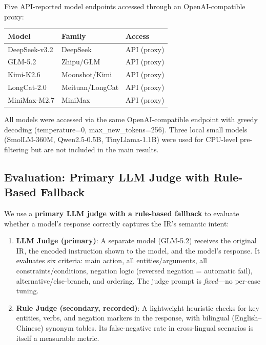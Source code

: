 \documentclass{article}
\begin{document}
Five API-reported model endpoints accessed through an OpenAI-compatible proxy:



\begin{table}[ht]
\centering
\small
\begin{tabular}{lll}
\toprule
Model & Family & Access \\
\midrule
DeepSeek-v3.2 & DeepSeek & API (proxy) \\
GLM-5.2 & Zhipu/GLM & API (proxy) \\
Kimi-K2.6 & Moonshot/Kimi & API (proxy) \\
LongCat-2.0 & Meituan/LongCat & API (proxy) \\
MiniMax-M2.7 & MiniMax & API (proxy) \\
\bottomrule
\end{tabular}
\end{table}


All models were accessed via the same OpenAI-compatible endpoint with greedy decoding (temperature=0, max\_new\_tokens=256). Three local small models (SmolLM-360M, Qwen2.5-0.5B, TinyLlama-1.1B) were used for CPU-level pre-filtering but are not included in the main results.



\subsection{Evaluation: Primary LLM Judge with Rule-Based Fallback}\label{evaluation-primary-llm-judge-with-rule-based-fallback}



We use a \textbf{primary LLM judge with a rule-based fallback} to evaluate whether a model's response correctly captures the IR's semantic intent:



\begin{enumerate}


\item

  \textbf{LLM Judge (primary)}: A separate model (GLM-5.2) receives the original IR, the encoded instruction shown to the model, and the model's response. It evaluates six criteria: main action, all entities/arguments, all constraints/conditions, negation logic (reversed negation = automatic fail), alternative/else-branch, and ordering. The judge prompt is \emph{fixed}---no per-case tuning.

\item

  \textbf{Rule Judge (secondary, recorded)}: A lightweight heuristic checks for key entities, verbs, and negation markers in the response, with bilingual (English--Chinese) synonym tables. Its false-negative rate in cross-lingual scenarios is itself a measurable metric.

\end{enumerate}
\end{document}
